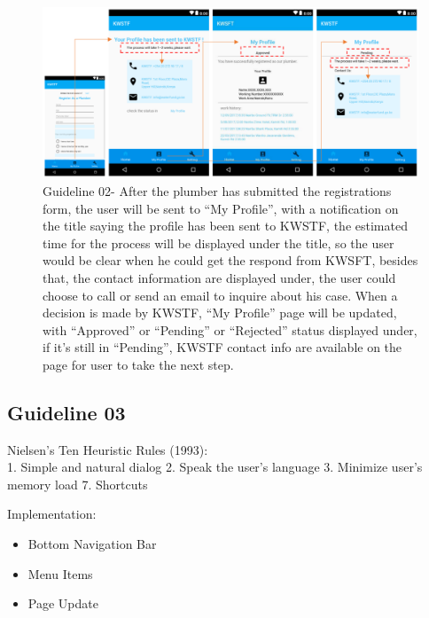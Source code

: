 \documentclass{article}
\begin{document}
\begin{figure}[H]
\centering
\includegraphics[width=15cm]{files/figures/fig2_guide2.png}
\caption{Guideline 02- After the plumber has submitted the registrations form, the user will be sent to “My Profile”, with a notification on the title saying
the profile has been sent to KWSTF, the estimated time for the process will be displayed under the title, so the user would be clear
when he could get the respond from KWSFT, besides that, the contact information are displayed under, the user could choose to
call or send an email to inquire about his case.
When a decision is made by KWSTF, “My Profile” page will be updated, with “Approved” or “Pending” or “Rejected” status
displayed under, if it’s still in “Pending”, KWSTF contact info are available on the page for user to take the next step.
}
\end{figure}

\subsection{Guideline 03}
Nielsen’s Ten Heuristic Rules (1993):\\
1. Simple and natural dialog 2. Speak the user’s language 3. Minimize user’s memory load 7. Shortcuts

\noindent
Implementation:
\begin{itemize}
\item Bottom Navigation Bar
\item Menu Items
\item Page Update
\end{itemize}
\end{document}
